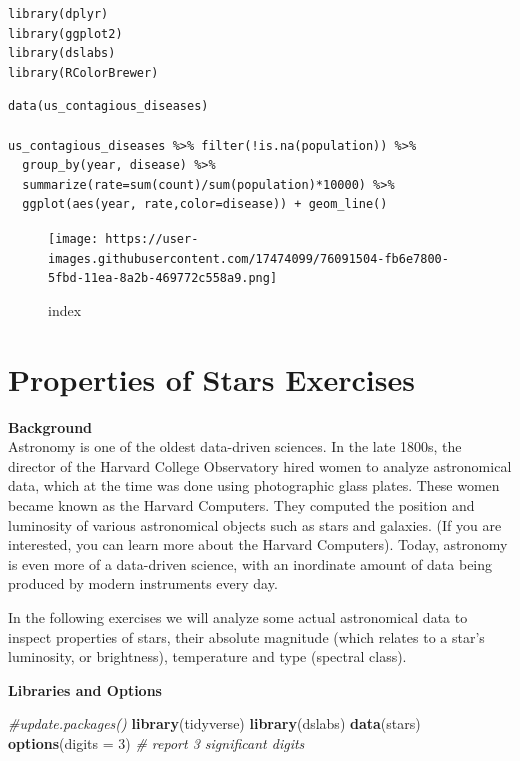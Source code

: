 \documentclass[
]{article}
\newenvironment{Shaded}{\begin{snugshade}}{\end{snugshade}}
\newcommand{\CommentTok}[1]{\textcolor[rgb]{0.56,0.35,0.01}{\textit{#1}}}
\newcommand{\DataTypeTok}[1]{\textcolor[rgb]{0.13,0.29,0.53}{#1}}
\newcommand{\DecValTok}[1]{\textcolor[rgb]{0.00,0.00,0.81}{#1}}
\newcommand{\KeywordTok}[1]{\textcolor[rgb]{0.13,0.29,0.53}{\textbf{#1}}}
\newcommand{\NormalTok}[1]{#1}
\begin{document}
\begin{verbatim}
library(dplyr)
library(ggplot2)
library(dslabs)
library(RColorBrewer)
\end{verbatim}

\begin{verbatim}
data(us_contagious_diseases)

us_contagious_diseases %>% filter(!is.na(population)) %>% 
  group_by(year, disease) %>%
  summarize(rate=sum(count)/sum(population)*10000) %>%
  ggplot(aes(year, rate,color=disease)) + geom_line()
\end{verbatim}

\begin{figure}
\centering
\texttt{[image: https://user-images.githubusercontent.com/17474099/76091504-fb6e7800-5fbd-11ea-8a2b-469772c558a9.png]}
\caption{index}
\end{figure}

\hypertarget{properties-of-stars-exercises}{%
\section{Properties of Stars
Exercises}\label{properties-of-stars-exercises}}

\textbf{Background}\\
Astronomy is one of the oldest data-driven sciences. In the late 1800s,
the director of the Harvard College Observatory hired women to analyze
astronomical data, which at the time was done using photographic glass
plates. These women became known as the Harvard Computers. They computed
the position and luminosity of various astronomical objects such as
stars and galaxies. (If you are interested, you can learn more about the
Harvard Computers). Today, astronomy is even more of a data-driven
science, with an inordinate amount of data being produced by modern
instruments every day.

In the following exercises we will analyze some actual astronomical data
to inspect properties of stars, their absolute magnitude (which relates
to a star's luminosity, or brightness), temperature and type (spectral
class).

\textbf{Libraries and Options}

\begin{Shaded}
\begin{Highlighting}[]
\CommentTok{#update.packages()}
\KeywordTok{library}\NormalTok{(tidyverse)}
\KeywordTok{library}\NormalTok{(dslabs)}
\KeywordTok{data}\NormalTok{(stars)}
\KeywordTok{options}\NormalTok{(}\DataTypeTok{digits =} \DecValTok{3}\NormalTok{)   }\CommentTok{# report 3 significant digits}
\end{Highlighting}
\end{Shaded}
\end{document}
